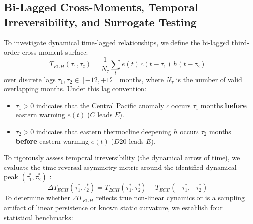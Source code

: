 \documentclass[11pt,a4paper]{article}
\begin{document}
\subsection{Bi-Lagged Cross-Moments, Temporal Irreversibility, and Surrogate Testing}
To investigate dynamical time-lagged relationships, we define the bi-lagged third-order cross-moment surface:
\begin{equation}
T_{ECH}(\tau_1, \tau_2) = \frac{1}{N_{\tau}} \sum_t e(t) \, c(t - \tau_1) \, h(t - \tau_2)
\label{eq:bilagged}
\end{equation}
over discrete lags $\tau_1, \tau_2 \in [-12, +12]$ months, where $N_{\tau}$ is the number of valid overlapping months. Under this lag convention:
\begin{itemize}
    \item $\tau_1 > 0$ indicates that the Central Pacific anomaly $c$ occurs $\tau_1$ months \textbf{before} eastern warming $e(t)$ ($C$ leads $E$).
    \item $\tau_2 > 0$ indicates that eastern thermocline deepening $h$ occurs $\tau_2$ months \textbf{before} eastern warming $e(t)$ ($D20$ leads $E$).
\end{itemize}
To rigorously assess temporal irreversibility (the dynamical arrow of time), we evaluate the time-reversal asymmetry metric around the identified dynamical peak $(\tau_1^*, \tau_2^*)$ \citep{pires2021bispectral}:
\begin{equation}
\Delta T_{ECH}(\tau_1^*, \tau_2^*) = T_{ECH}(\tau_1^*, \tau_2^*) - T_{ECH}(-\tau_1^*, -\tau_2^*)
\label{eq:asymmetry_metric}
\end{equation}
To determine whether $\Delta T_{ECH}$ reflects true non-linear dynamics or is a sampling artifact of linear persistence or known static curvature, we establish four statistical benchmarks:
\end{document}
